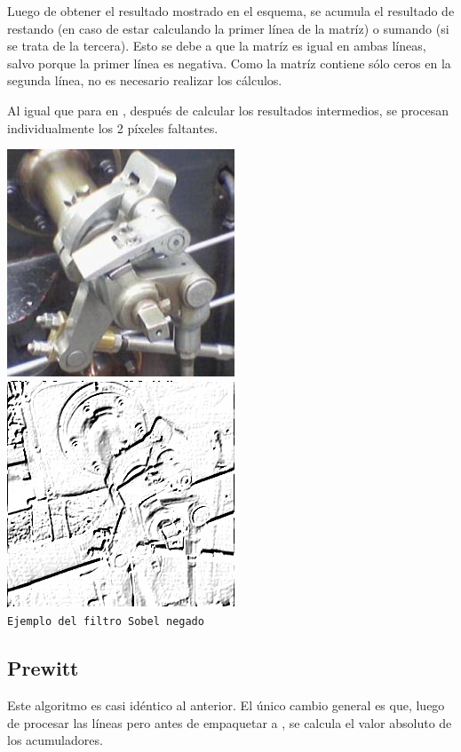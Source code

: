 Luego de obtener el resultado mostrado en el esquema, se acumula el resultado de  restando (en caso de estar calculando la primer 
línea de la matríz) o sumando (si se trata de la tercera). Esto se debe a que la matríz es igual en ambas líneas, salvo porque la primer línea es 
negativa. Como la matríz contiene sólo ceros en la segunda línea, no es necesario realizar los cálculos.

Al igual que para  en , después de calcular los resultados intermedios, se procesan individualmente los 2 píxeles faltantes.

\begin{center}
\includegraphics[scale=0.5]{../imgs/steam-engine.jpg}
\includegraphics[scale=0.5]{../imgs/steam-engine-sobel.jpg}\\
\texttt{\small Ejemplo del filtro Sobel negado}\\
\end{center}


\vspace{5mm}
\subsection{Prewitt}
	Este algoritmo es casi idéntico al anterior. El único cambio general es que, luego de procesar las líneas pero antes
de empaquetar a , se calcula el valor absoluto de los acumuladores.

